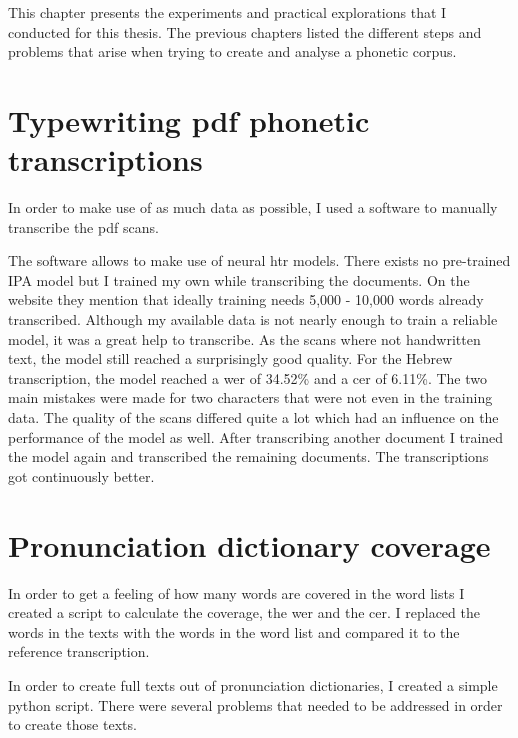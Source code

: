 
\label{chap:exp}
This chapter presents the experiments and practical explorations that I conducted for this thesis. The previous chapters listed the different steps and problems that arise when trying to create and analyse a phonetic corpus. 

\section{Typewriting pdf phonetic transcriptions}
In order to make use of as much data as possible, I used a software to manually transcribe the pdf scans.

The software allows to make use of neural \ac{htr} models. There exists no pre-trained IPA model but I trained my own while transcribing the documents. On the website they mention that ideally training needs 5,000 - 10,000 words already transcribed. Although my available data is not nearly enough to train a reliable model, it was a great help to transcribe. As the scans where not handwritten text, the model still reached a surprisingly good quality. For the Hebrew transcription, the model reached a \ac{wer} of 34.52\% and a \ac{cer} of 6.11\%. The two main mistakes were made for two characters that were not even in the training data. The quality of the scans differed quite a lot which had an influence on the performance of the model as well. After transcribing another document I trained the model again and transcribed the remaining documents. The transcriptions got continuously better.

\section{Pronunciation dictionary coverage}
In order to get a feeling of how many words are covered in the word lists I created a script to calculate the coverage, the \ac{wer} and the \ac{cer}. I replaced the words in the texts with the words in the word list and compared it to the reference transcription.


In order to create full texts out of pronunciation dictionaries, I created a simple python script. There were several problems that needed to be addressed in order to create those texts. 

